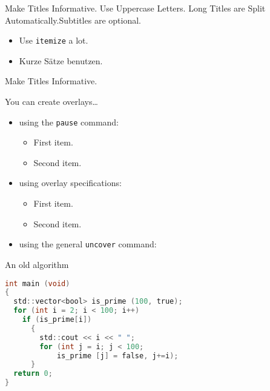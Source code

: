 \documentclass[ucs,9pt]{beamer}
\begin{document}
\begin{frame}{Make Titles Informative. Use Uppercase Letters. Long Titles are Split Automatically.}{Subtitles are optional.}
  \begin{itemize}
  \item
    Use \texttt{itemize} a lot.
  \item
   	Kurze Sätze benutzen.
  \end{itemize}
\end{frame}

\begin{frame}{Make Titles Informative.}

  You can create overlays\dots
  \begin{itemize}
  \item using the \texttt{pause} command:
    \begin{itemize}
    \item
      First item.
      \pause
    \item    
      Second item.
    \end{itemize}
  \item
    using overlay specifications:
    \begin{itemize}
    \item<3->
      First item.
    \item<4->
      Second item.
    \end{itemize}
  \item
    using the general \texttt{uncover} command:
    \begin{itemize}
    \end{itemize}
  \end{itemize}
\end{frame}



\begin{frame}[fragile]{An old algorithm}
\begin{lstlisting}[language=C]
int main (void)
{
  std::vector<bool> is_prime (100, true);
  for (int i = 2; i < 100; i++)
    if (is_prime[i])
      {
        std::cout << i << " ";
        for (int j = i; j < 100;
            is_prime [j] = false, j+=i);
      }
  return 0;
}
\end{lstlisting}
\end{frame}
\end{document}
